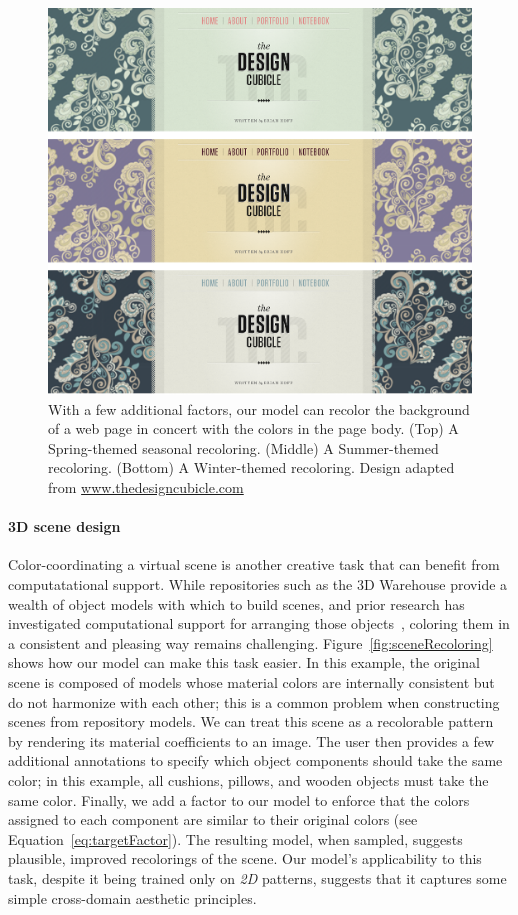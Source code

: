 \begin{figure}
\centering
\includegraphics[width=\columnwidth]{figs/webpageRecoloring}
\caption{With a few additional factors, our model can recolor the background of a web page in concert with the colors in the page body. (Top) A Spring-themed seasonal recoloring. (Middle) A Summer-themed recoloring. (Bottom) A Winter-themed recoloring. Design adapted from \url{www.thedesigncubicle.com}}
\label{fig:webpageRecoloring}
\end{figure}

\paragraph{3D scene design}
Color-coordinating a virtual scene is another creative task that can benefit from computatational support. While repositories such as the 3D Warehouse provide a wealth of object models with which to build scenes, and prior research has investigated computational support for arranging those objects~\cite{SceneSynth}, coloring them in a consistent and pleasing way remains challenging. Figure~\ref{fig:sceneRecoloring} shows how our model can make this task easier. In this example, the original scene is composed of models whose material colors are internally consistent but do not harmonize with each other; this is a common problem when constructing scenes from repository models. We can treat this scene as a recolorable pattern by rendering its material coefficients to an image. The user then provides a few additional annotations to specify which object components should take the same color; in this example, all cushions, pillows, and wooden objects must take the same color. Finally, we add a factor to our model to enforce that the colors assigned to each component are similar to their original colors (see Equation~\ref{eq:targetFactor}). The resulting model, when sampled, suggests plausible, improved recolorings of the scene. Our model's applicability to this task, despite it being trained only on \emph{2D} patterns, suggests that it captures some simple cross-domain aesthetic principles.


